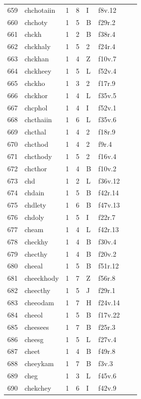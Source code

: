 \documentclass[11pt,a4paper]{article}
\begin{document}
\begin{landscape}
\begin{longtable}{@{}r>{\ttfamily}lrrl>{\ttfamily}l>{\raggedright\arraybackslash}p{80mm}>{\raggedright\arraybackslash}p{36mm}@{}}
659 & chchotaiin & 1 & 8 & I & f8v.12 &  & \\
660 & chchoty & 1 & 5 & B & f29r.2 &  & \\
661 & chckh & 1 & 2 & B & f38r.4 &  & \\
662 & chckhaly & 1 & 5 & 2 & f24r.4 &  & \\
663 & chckhan & 1 & 4 & Z & f10v.7 &  & \\
664 & chckheey & 1 & 5 & L & f52v.4 &  & \\
665 & chckho & 1 & 3 & 2 & f17r.9 &  & \\
666 & chckhor & 1 & 4 & L & f35v.5 &  & \\
667 & chcphol & 1 & 4 & I & f52v.1 &  & \\
668 & chcthaiin & 1 & 6 & L & f35v.6 &  & \\
669 & chcthal & 1 & 4 & 2 & f18r.9 &  & \\
670 & chcthod & 1 & 4 & 2 & f9r.4 &  & \\
671 & chcthody & 1 & 5 & 2 & f16v.4 &  & \\
672 & chcthor & 1 & 4 & B & f10v.2 &  & \\
673 & chd & 1 & 2 & L & f36v.12 &  & \\
674 & chdain & 1 & 5 & B & f42r.14 &  & \\
675 & chdlety & 1 & 6 & B & f47v.13 &  & \\
676 & chdoly & 1 & 5 & I & f22r.7 &  & \\
677 & cheam & 1 & 4 & L & f42r.13 &  & \\
678 & checkhy & 1 & 4 & B & f30v.4 &  & \\
679 & checthy & 1 & 4 & B & f20v.2 &  & \\
680 & cheeal & 1 & 5 & B & f51r.12 &  & \\
681 & cheeckhody & 1 & 7 & Z & f56r.8 &  & \\
682 & cheecthy & 1 & 5 & J & f29r.1 &  & \\
683 & cheeodam & 1 & 7 & H & f24v.14 &  & \\
684 & cheeol & 1 & 5 & B & f17v.22 &  & \\
685 & cheesees & 1 & 7 & B & f25r.3 &  & \\
686 & cheesg & 1 & 5 & L & f27v.4 &  & \\
687 & cheet & 1 & 4 & B & f49r.8 &  & \\
688 & cheeykam & 1 & 7 & B & f3v.3 &  & \\
689 & cheg & 1 & 3 & L & f45v.6 &  & \\
690 & chekchey & 1 & 6 & I & f42v.9 &  & \\

\end{longtable}
\end{landscape}
\end{document}
